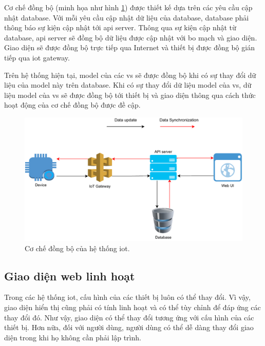 Cơ chế đồng bộ (minh họa như hình \ref{fig:sync-mechani-overview}) được thiết kế dựa trên các yêu cầu cập nhật database. Với mỗi yêu cầu cập nhật dữ liệu của database, database phải thông báo sự kiện cập nhật tới \acrshort{api} server. Thông qua sự kiện cập nhật từ database, \acrshort{api} server sẽ đồng bộ dữ liệu được cập nhật với bo mạch và giao diện. Giao diện sẽ được đồng bộ trực tiếp qua Internet và thiết bị được đồng bộ gián tiếp qua \acrshort{iot} gateway.

Trên hệ thống hiện tại, model của các \acrfull{vs} sẽ được đồng bộ khi có sự thay đổi dữ liệu của model này trên database. Khi có sự thay đổi dữ liệu model của \acrshort{vs}, dữ liệu model của \acrshort{vs} sẽ được đồng bộ tới thiết bị và giao diện thông qua cách thức hoạt động của cơ chế đồng bộ được đề cập.

\begin{figure}[htp]
\centering
\includegraphics[width=1.0\linewidth]{images/Thesis-Page-6-sync-mecha.pdf}
\caption{Cơ chế đồng bộ của hệ thống \acrshort{iot}.}
\label{fig:sync-mechani-overview}
\end{figure}

\subsection{Giao diện web linh hoạt}

Trong các hệ thống \acrshort{iot}, cấu hình của các thiết bị luôn có thể thay đổi. Vì vậy, giao diện hiển thị cũng phải có tính linh hoạt và có thể tùy chỉnh để đáp ứng các thay đổi đó. Như vậy, giao diện có thể thay đổi tương ứng với cấu hình của các thiết bị. Hơn nữa, đối với người dùng, người dùng có thể dễ dàng thay đổi giao diện trong khi họ không cần phải lập trình.

